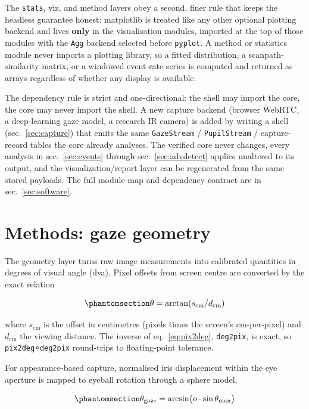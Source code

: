 \documentclass[
]{article}
\begin{document}
The \texttt{stats}, viz, and method layers obey a second, finer rule
that keeps the headless guarantee honest: matplotlib is treated like any
other optional plotting backend and lives \textbf{only} in the
visualisation modules, imported at the top of those modules with the
\texttt{Agg} backend selected before \texttt{pyplot}. A method or
statistics module never imports a plotting library, so a fitted
distribution, a scanpath-similarity matrix, or a windowed event-rate
series is computed and returned as arrays regardless of whether any
display is available.

The dependency rule is strict and one-directional: the shell may import
the core, the core may never import the shell. A new capture backend
(browser WebRTC, a deep-learning gaze model, a research IR camera) is
added by writing a shell (sec.~\ref{sec:capture}) that emits the same
\texttt{GazeStream} / \texttt{PupilStream} / capture-record tables the
core already analyses. The verified core never changes, every analysis
in sec.~\ref{sec:events} through sec.~\ref{sec:advdetect} applies
unaltered to its output, and the visualization/report layer can be
regenerated from the same stored payloads. The full module map and
dependency contract are in sec.~\ref{sec:software}.

\section{Methods: gaze geometry}\label{sec:geometry}

The geometry layer turns raw image measurements into calibrated
quantities in degrees of visual angle (dva). Pixel offsets from screen
centre are converted by the exact relation

\begin{equation}\protect\phantomsection\label{eq:pix2deg}{\theta = \arctan(s_\text{cm} / d_\text{cm})}\end{equation}

where \(s_{\mathrm{cm}}\) is the offset in centimetres (pixels times the
screen's cm-per-pixel) and \(d_{\mathrm{cm}}\) the viewing distance. The
inverse of eq.~\ref{eq:pix2deg}, \texttt{deg2pix}, is exact, so
\texttt{pix2deg}∘\texttt{deg2pix} round-trips to floating-point
tolerance.

For appearance-based capture, normalised iris displacement within the
eye aperture is mapped to eyeball rotation through a sphere model,

\begin{equation}\protect\phantomsection\label{eq:iris}{\theta_{\mathrm{gaze}} = \arcsin\!\big(o \cdot \sin\theta_{\max}\big)}\end{equation}
\end{document}
